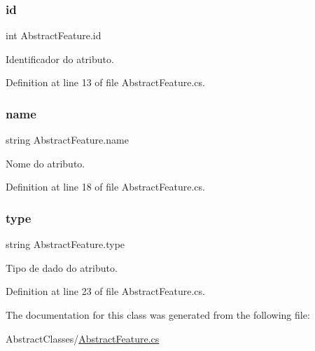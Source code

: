 \subsubsection{\texorpdfstring{id}{id}}
{\footnotesize\ttfamily int Abstract\+Feature.\+id}



Identificador do atributo. 



Definition at line 13 of file Abstract\+Feature.\+cs.

\hypertarget{class_abstract_feature_a48465ede21b778021ea03b56d2117bc8}{}\label{class_abstract_feature_a48465ede21b778021ea03b56d2117bc8} 
\subsubsection{\texorpdfstring{name}{name}}
{\footnotesize\ttfamily string Abstract\+Feature.\+name}



Nome do atributo. 



Definition at line 18 of file Abstract\+Feature.\+cs.

\hypertarget{class_abstract_feature_ac65cf0de277a8a62b6b1e1bdc249b237}{}\label{class_abstract_feature_ac65cf0de277a8a62b6b1e1bdc249b237} 
\subsubsection{\texorpdfstring{type}{type}}
{\footnotesize\ttfamily string Abstract\+Feature.\+type}



Tipo de dado do atributo. 



Definition at line 23 of file Abstract\+Feature.\+cs.



The documentation for this class was generated from the following file\+:\begin{DoxyCompactItemize}
\item 
Abstract\+Classes/\hyperlink{_abstract_feature_8cs}{Abstract\+Feature.\+cs}\end{DoxyCompactItemize}
